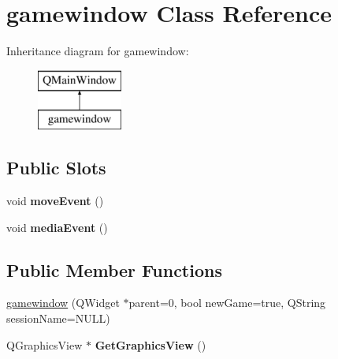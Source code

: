 \hypertarget{classgamewindow}{\section{gamewindow Class Reference}
\label{classgamewindow}
}
Inheritance diagram for gamewindow\-:\begin{figure}[H]
\begin{center}
\leavevmode
\includegraphics[height=2.000000cm]{classgamewindow}
\end{center}
\end{figure}
\subsection*{Public Slots}
\begin{DoxyCompactItemize}
\item 
\hypertarget{classgamewindow_a69fdf6888c6496deedba54f588867415}{void {\bfseries move\-Event} ()}\label{classgamewindow_a69fdf6888c6496deedba54f588867415}

\item 
\hypertarget{classgamewindow_a4a43db9e7606e3e24a63baf6d36a7e79}{void {\bfseries media\-Event} ()}\label{classgamewindow_a4a43db9e7606e3e24a63baf6d36a7e79}

\end{DoxyCompactItemize}
\subsection*{Public Member Functions}
\begin{DoxyCompactItemize}
\item 
\hyperlink{classgamewindow_a3e131541b6a8c961d0156a62a02b7862}{gamewindow} (Q\-Widget $\ast$parent=0, bool new\-Game=true, Q\-String session\-Name=N\-U\-L\-L)
\item 
\hypertarget{classgamewindow_ac1f14593e7296da6c62db78f159e48c8}{Q\-Graphics\-View $\ast$ {\bfseries Get\-Graphics\-View} ()}\label{classgamewindow_ac1f14593e7296da6c62db78f159e48c8}

\end{DoxyCompactItemize}
